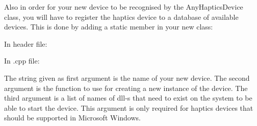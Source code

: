Also in order for your new device to be recognised by the
AnyHapticsDevice class, you will have to register the haptics device
to a database of available devices. This is done by adding a
static member in your new class:

In header file:



In .cpp file:



The string given as first argument is the name of your new device. The second
argument is the function to use for creating a new instance of the device. The
third argument is a list of names of dll-s that need to exist on the system to
be able to start the device. This argument is only required for haptics devices
that should be supported in Microsoft Windows.


